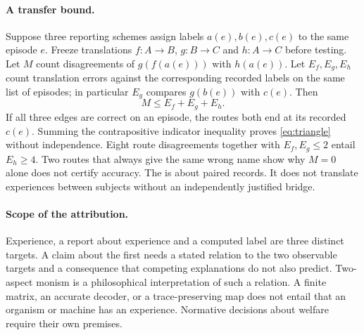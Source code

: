 \paragraph{A transfer bound.}
Suppose three reporting schemes assign labels $a(e),b(e),c(e)$ to the same episode $e$. Freeze translations $f:A\to B$, $g:B\to C$ and $h:A\to C$ before testing. Let $M$ count disagreements of $g(f(a(e)))$ with $h(a(e))$. Let $E_f,E_g,E_h$ count translation errors against the corresponding recorded labels on the same list of episodes; in particular $E_g$ compares $g(b(e))$ with $c(e)$. Then
\begin{equation}
 M\le E_f+E_g+E_h .
\label{eq:triangle}
\end{equation}
If all three edges are correct on an episode, the routes both end at its recorded $c(e)$. Summing the contrapositive indicator inequality proves \eqref{eq:triangle} without independence. Eight route disagreements together with $E_f,E_g\le2$ entail $E_h\ge4$. Two routes that always give the same wrong name show why $M=0$ alone does not certify accuracy. The  is about paired records. It does not translate experiences between subjects without an independently justified bridge.

\paragraph{Scope of the attribution.}
Experience, a report about experience and a computed label are three distinct targets. A claim about the first needs a stated relation to the two observable targets and a consequence that competing explanations do not also predict. Two-aspect monism is a philosophical interpretation of such a relation. A finite matrix, an accurate decoder, or a trace-preserving map does not entail that an organism or machine has an experience. Normative decisions about welfare require their own premises.
